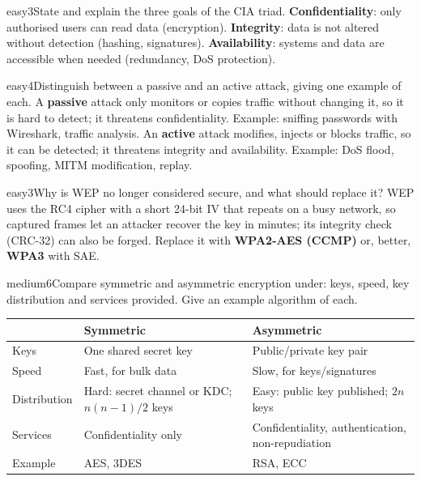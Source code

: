 \documentclass[10pt]{article}
\begin{document}
\begin{practice}{easy}{3}State and explain the three goals of the CIA triad.
\sol \textbf{Confidentiality}: only authorised users can read data (encryption). \textbf{Integrity}: data is not altered without detection (hashing, signatures). \textbf{Availability}: systems and data are accessible when needed (redundancy, DoS protection).
\end{practice}

\begin{practice}{easy}{4}Distinguish between a passive and an active attack, giving one example of each.
\sol A \textbf{passive} attack only monitors or copies traffic without changing it, so it is hard to detect; it threatens confidentiality. Example: sniffing passwords with Wireshark, traffic analysis.
An \textbf{active} attack modifies, injects or blocks traffic, so it can be detected; it threatens integrity and availability. Example: DoS flood, spoofing, MITM modification, replay.
\end{practice}

\begin{practice}{easy}{3}Why is WEP no longer considered secure, and what should replace it?
\sol WEP uses the RC4 cipher with a short 24-bit IV that repeats on a busy network, so captured frames let an attacker recover the key in minutes; its integrity check (CRC-32) can also be forged. Replace it with \textbf{WPA2-AES (CCMP)} or, better, \textbf{WPA3} with SAE.
\end{practice}

\begin{practice}{medium}{6}Compare symmetric and asymmetric encryption under: keys, speed, key distribution and services provided. Give an example algorithm of each.
\sol
\begin{tabularx}{\linewidth}{@{}lXX@{}}
\toprule
 & \textbf{Symmetric} & \textbf{Asymmetric}\\\midrule
Keys & One shared secret key & Public/private key pair\\
Speed & Fast, for bulk data & Slow, for keys/signatures\\
Distribution & Hard: secret channel or KDC; $n(n-1)/2$ keys & Easy: public key published; $2n$ keys\\
Services & Confidentiality only & Confidentiality, authentication, non-repudiation\\
Example & AES, 3DES & RSA, ECC\\
\bottomrule
\end{tabularx}
\end{practice}
\end{document}
